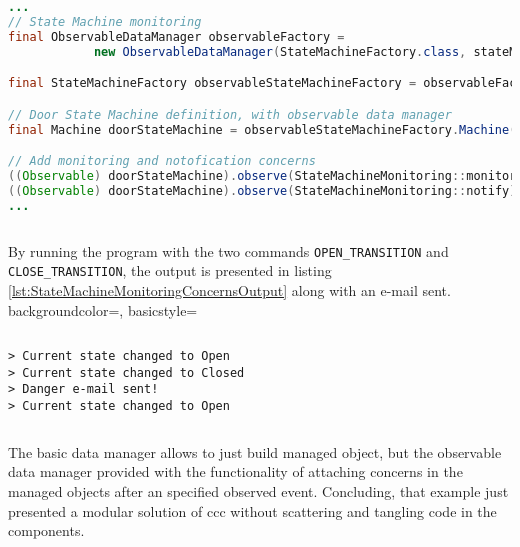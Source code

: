 \begin{sourcecode} [H]
	\begin{lstlisting}[language=Java, escapechar=|]
...
// State Machine monitoring
final ObservableDataManager observableFactory = 
			new ObservableDataManager(StateMachineFactory.class, stateMachineSchema);

final StateMachineFactory observableStateMachineFactory = observableFactory.make();

// Door State Machine definition, with observable data manager
final Machine doorStateMachine = observableStateMachineFactory.Machine();

// Add monitoring and notofication concerns
((Observable) doorStateMachine).observe(StateMachineMonitoring::monitor); |\label{line:state_machine_monitor}|
((Observable) doorStateMachine).observe(StateMachineMonitoring::notify);  |\label{line:state_machine_notify}|
...
	\end{lstlisting}
	\caption{Door state machine with concerns}
	\label{lst:StateMachineMonitoringConcerns}
\end{sourcecode}

By running the program with the two commands \texttt{OPEN\_TRANSITION} and \texttt{CLOSE\_TRANSITION}, the output is presented in listing \ref{lst:StateMachineMonitoringConcernsOutput} along with an e-mail sent.
 {
    backgroundcolor=\color{white},
    basicstyle=\scriptsize\color{black}\ttfamily
}

\begin{sourcecode} [H]
	\lstset{numbers=none}
	\begin{lstlisting}[style=Bash]
> Current state changed to Open
> Current state changed to Closed
> Danger e-mail sent!
> Current state changed to Open
	\end{lstlisting}
	\caption{Door state machine with concerns: output}
	\label{lst:StateMachineMonitoringConcernsOutput}
\end{sourcecode}

The basic data manager allows to just build managed object, but the observable data manager provided with the functionality of attaching concerns in the managed objects after an specified observed event.
Concluding, that example just presented a modular solution of \ac{ccc} without scattering and tangling code in the components.
